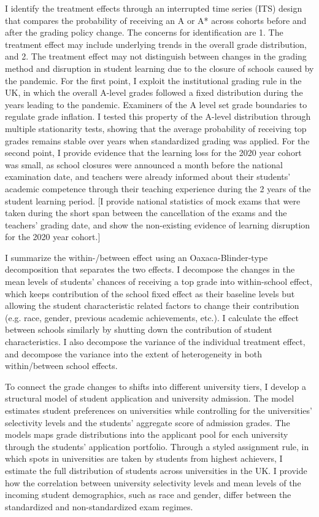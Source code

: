 I identify the treatment effects through an interrupted time series (ITS) design that compares the probability of receiving an A or A* across cohorts before and after the grading policy change. The concerns for identification are 1. The treatment effect may include underlying trends in the overall grade distribution, and 2. The treatment effect may not distinguish between changes in the grading method and disruption in student learning due to the closure of schools caused by the pandemic. For the first point, I exploit the institutional grading rule in the UK, in which the overall A-level grades followed a fixed distribution during the years leading to the pandemic. Examiners of the A level set grade boundaries to regulate grade inflation. I tested this property of the A-level distribution through multiple stationarity tests, showing that the average probability of receiving top grades remains stable over years when standardized grading was applied. For the second point, I provide evidence that the learning loss for the 2020 year cohort was small, as school closures were announced a month before the national examination date, and teachers were already informed about their students' academic competence through their teaching experience during the 2 years of the student learning period. [I provide national statistics of mock exams that were taken during the short span between the cancellation of the exams and the teachers' grading date, and show the non-existing evidence of learning disruption for the 2020 year cohort.]

I summarize the within-/between effect using an Oaxaca-Blinder-type decomposition that separates the two effects. I decompose the changes in the mean levels of students' chances of receiving a top grade into within-school effect, which keeps contribution of the school fixed effect as their baseline levels but allowing the student characteristic related factors to change their contribution (e.g. race, gender, previous academic achievements, etc.). I calculate the effect between schools similarly by shutting down the contribution of student characteristics. I also decompose the variance of the individual treatment effect, and decompose the variance into the extent of heterogeneity in both within/between school effects. 

To connect the grade changes to shifts into different university tiers, I develop a structural model of student application and university admission. The model estimates student preferences on universities while controlling for the universities' selectivity levels and the students' aggregate score of admission grades. The models maps grade distributions into the applicant pool for each university through the students' application portfolio. Through a styled assignment rule, in which spots in universities are taken by students from highest achievers, I estimate the full distribution of students across universities in the UK. I provide how the correlation between university selectivity levels and mean levels of the incoming student demographics, such as race and gender, differ between the standardized and non-standardized exam regimes.


